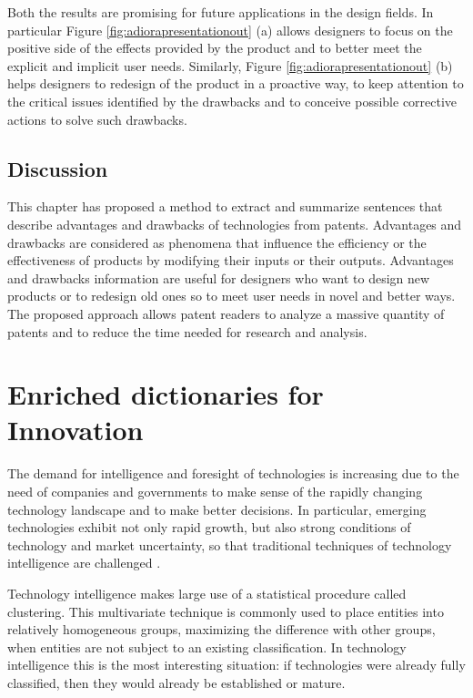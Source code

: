 \documentclass[b5paper,]{book}
\theoremstyle{definition}
\theoremstyle{definition}
\theoremstyle{definition}
\theoremstyle{remark}
\begin{document}
Both the results are promising for future applications in the design
fields. In particular Figure \ref{fig:adiorapresentationout} (a) allows
designers to focus on the positive side of the effects provided by the
product and to better meet the explicit and implicit user needs.
Similarly, Figure \ref{fig:adiorapresentationout} (b) helps designers to
redesign of the product in a proactive way, to keep attention to the
critical issues identified by the drawbacks and to conceive possible
corrective actions to solve such drawbacks.

\section{Discussion}\label{discussion}

This chapter has proposed a method to extract and summarize sentences
that describe advantages and drawbacks of technologies from patents.
Advantages and drawbacks are considered as phenomena that influence the
efficiency or the effectiveness of products by modifying their inputs or
their outputs. Advantages and drawbacks information are useful for
designers who want to design new products or to redesign old ones so to
meet user needs in novel and better ways. The proposed approach allows
patent readers to analyze a massive quantity of patents and to reduce
the time needed for research and analysis.

\chapter{Enriched dictionaries for
Innovation}\label{enriched-dictionaries-for-innovation}

The demand for intelligence and foresight of technologies is increasing
due to the need of companies and governments to make sense of the
rapidly changing technology landscape and to make better decisions. In
particular, emerging technologies exhibit not only rapid growth, but
also strong conditions of technology and market uncertainty, so that
traditional techniques of technology intelligence are challenged
\citep{rotolo2015emerging}.

Technology intelligence makes large use of a statistical procedure
called clustering. This multivariate technique is commonly used to place
entities into relatively homogeneous groups, maximizing the difference
with other groups, when entities are not subject to an existing
classification. In technology intelligence this is the most interesting
situation: if technologies were already fully classified, then they
would already be established or mature.
\end{document}

